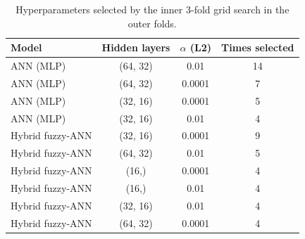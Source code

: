 \begin{table}[!htbp]
\centering
\caption{Hyperparameters selected by the inner 3-fold grid search in the \CVfits{} outer folds.}
\label{tab:A-hyper}
\footnotesize
\begin{tabular}{lccc}
\toprule
Model & Hidden layers & $\alpha$ (L2) & Times selected\\
\midrule
ANN (MLP) & (64, 32) & 0.01 & 14\\
ANN (MLP) & (64, 32) & 0.0001 & 7\\
ANN (MLP) & (32, 16) & 0.0001 & 5\\
ANN (MLP) & (32, 16) & 0.01 & 4\\
Hybrid fuzzy-ANN & (32, 16) & 0.0001 & 9\\
Hybrid fuzzy-ANN & (64, 32) & 0.01 & 5\\
Hybrid fuzzy-ANN & (16,) & 0.0001 & 4\\
Hybrid fuzzy-ANN & (16,) & 0.01 & 4\\
Hybrid fuzzy-ANN & (32, 16) & 0.01 & 4\\
Hybrid fuzzy-ANN & (64, 32) & 0.0001 & 4\\
\bottomrule
\end{tabular}
\end{table}

